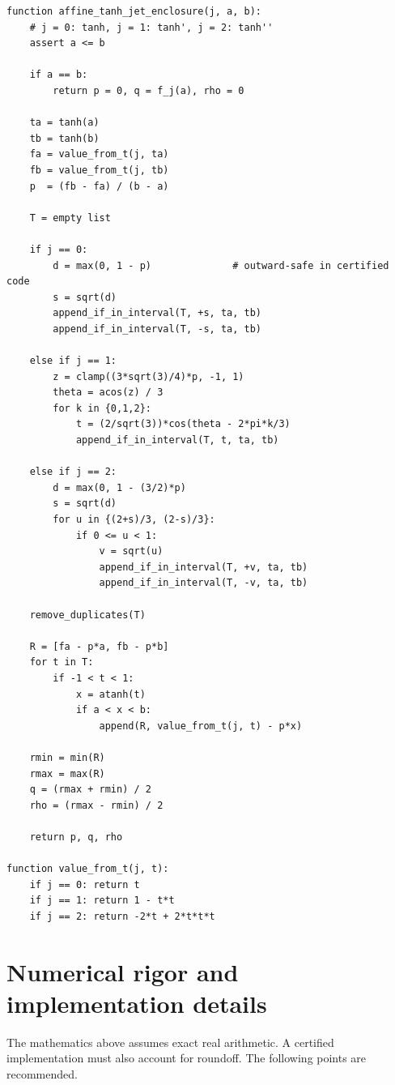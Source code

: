 \documentclass[11pt]{article}
\begin{document}
\begin{lstlisting}[style=pseudo]
function affine_tanh_jet_enclosure(j, a, b):
    # j = 0: tanh, j = 1: tanh', j = 2: tanh''
    assert a <= b

    if a == b:
        return p = 0, q = f_j(a), rho = 0

    ta = tanh(a)
    tb = tanh(b)
    fa = value_from_t(j, ta)
    fb = value_from_t(j, tb)
    p  = (fb - fa) / (b - a)

    T = empty list

    if j == 0:
        d = max(0, 1 - p)              # outward-safe in certified code
        s = sqrt(d)
        append_if_in_interval(T, +s, ta, tb)
        append_if_in_interval(T, -s, ta, tb)

    else if j == 1:
        z = clamp((3*sqrt(3)/4)*p, -1, 1)
        theta = acos(z) / 3
        for k in {0,1,2}:
            t = (2/sqrt(3))*cos(theta - 2*pi*k/3)
            append_if_in_interval(T, t, ta, tb)

    else if j == 2:
        d = max(0, 1 - (3/2)*p)
        s = sqrt(d)
        for u in {(2+s)/3, (2-s)/3}:
            if 0 <= u < 1:
                v = sqrt(u)
                append_if_in_interval(T, +v, ta, tb)
                append_if_in_interval(T, -v, ta, tb)

    remove_duplicates(T)

    R = [fa - p*a, fb - p*b]
    for t in T:
        if -1 < t < 1:
            x = atanh(t)
            if a < x < b:
                append(R, value_from_t(j, t) - p*x)

    rmin = min(R)
    rmax = max(R)
    q = (rmax + rmin) / 2
    rho = (rmax - rmin) / 2

    return p, q, rho

function value_from_t(j, t):
    if j == 0: return t
    if j == 1: return 1 - t*t
    if j == 2: return -2*t + 2*t*t*t
\end{lstlisting}

\section{Numerical rigor and implementation details}

The mathematics above assumes exact real arithmetic. A certified implementation must also account for roundoff. The following points are recommended.
\end{document}
